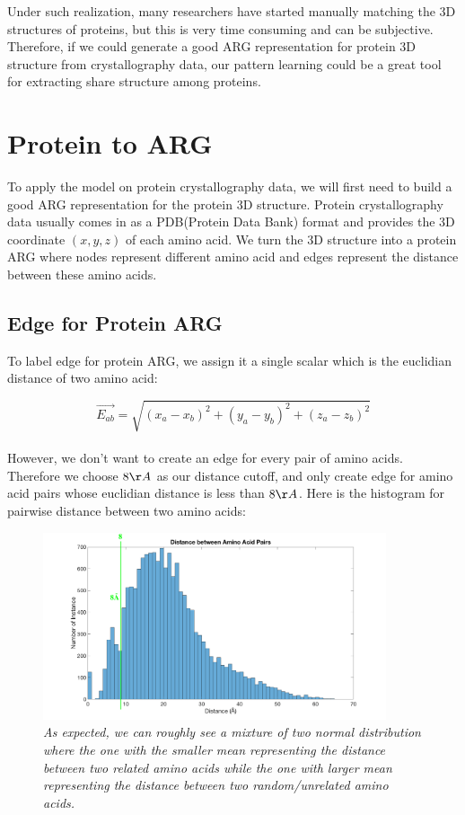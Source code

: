 Under such realization, many researchers have started manually matching the 3D structures of proteins, but this is very time consuming and can be subjective. Therefore, if we could generate a good ARG representation for protein 3D structure from crystallography data, our pattern learning could be a great tool for extracting share structure among proteins.

\section{Protein to ARG}

To apply the model on protein crystallography data, we will first need to build a good ARG representation for the protein 3D structure. Protein crystallography data usually comes in as a PDB(Protein Data Bank) format and provides the 3D coordinate $(x, y, z)$ of each amino acid. We turn the 3D structure into a protein ARG where nodes represent different amino acid and edges represent the distance between these amino acids.

\subsection{Edge for Protein ARG}

To label edge for protein ARG, we assign it a single scalar which is the euclidian distance of two amino acid:

\begin{equation} 
\overrightarrow{E_{ab}}=\sqrt{(x_a-x_b)^2+(y_a-y_b)^2+(z_a-z_b)^2}
\end{equation}\\

However, we don't want to create an edge for every pair of amino acids. Therefore we choose $8\AA$ as our distance cutoff, and only create edge for amino acid pairs whose euclidian distance is less than $8\AA$. Here is the histogram for pairwise distance between two amino acids:

\begin{figure}[h]
	\centering
	\captionsetup{justification=centering}
	\includegraphics[width=0.9\textwidth]{figs/distance.png}
	\caption[Caption for LOF]{\emph{As expected, we can roughly see a mixture of two normal distribution where the one with the smaller mean representing the distance between two related amino acids while the one with larger mean representing the distance between two random/unrelated amino acids.}}
	\label{fig:distance}
\end{figure}

